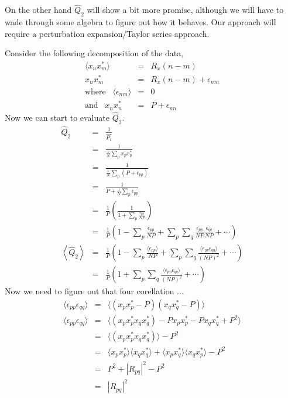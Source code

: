 On the other hand $\hat{Q}_2$ will show a bit more promise, although
we will have to wade through some algebra to figure out how it
behaves.  Our approach will require a perturbation expansion/Taylor
series approach.

Consider the following decomposition of the data,
\begin{eqnarray}
\langle x_n x_m^\ast \rangle &=& R_x(n-m) \\
x_n x_m^\ast &=& R_x(n-m) + \epsilon_{nm} \\
\textrm{where} \;\;\; \langle \epsilon_{nm} \rangle &=& 0 \\
\textrm{and} \;\;\; x_n x_n^\ast &=& P + \epsilon_{nn} 
\end{eqnarray}
Now we can start to evaluate $\hat{Q}_2$.
\begin{eqnarray}
\hat{Q}_2 &=& \frac{1}{\hat{P_1}} \\
&=& \frac{1}{\frac{1}{N}\sum_p x_p x_p^\ast} \\
&=& \frac{1}{\frac{1}{N}\sum_p (P + \epsilon_{pp})} \\
&=& \frac{1}{P + \frac{1}{N}\sum_p \epsilon_{pp}} \\
&=& \frac{1}{P}\left(\frac{1}{1 + \sum_p \frac{\epsilon_{pp}}{NP}}\right) \\
&=& \frac{1}{P}\left(1 -  \sum_p  \frac{\epsilon_{pp}}{NP} + 
\sum_p \sum_q  \frac{\epsilon_{pp}}{NP} \frac{\epsilon_{qq}}{NP} +
\cdots \right) \\
%
\left\langle \hat{Q}_2 \right\rangle &=& \frac{1}{P} \left( 1 - 
\sum_p  \frac{\langle \epsilon_{pp}\rangle}{NP} + 
\sum_p \sum_q  \frac{\langle \epsilon_{pp} \epsilon_{qq}\rangle}{(NP)^2} +
\cdots \right) \\
&=& \frac{1}{P} \left( 1 + \sum_p \sum_q  \frac{\langle \epsilon_{pp} \epsilon_{qq}\rangle}{(NP)^2} +
\cdots \right) 
\end{eqnarray}
Now we need to figure out that four corellation ...
\begin{eqnarray}
\langle \epsilon_{pp} \epsilon_{qq} \rangle &=& 
\langle (x_p x^\ast_p - P) (x_q x^\ast_q - P) \rangle \\
\langle \epsilon_{pp} \epsilon_{qq} \rangle &=& 
\langle (x_p x^\ast_p x_q x^\ast_q) - P x_p x^\ast_p - P x_q x^\ast_q + P^2 \rangle \\
&=& \langle (x_p x^\ast_p x_q x^\ast_q)\rangle - P^2 \\
&=& \langle x_p x^\ast_p \rangle \langle x_q x^\ast_q \rangle
+\langle x_p x^\ast_q\rangle \langle x_q x^\ast_p \rangle - P^2 \\
&=& P^2 + |R_{pq}|^2 - P^2 \\
&=& |R_{pq}|^2
\end{eqnarray}

